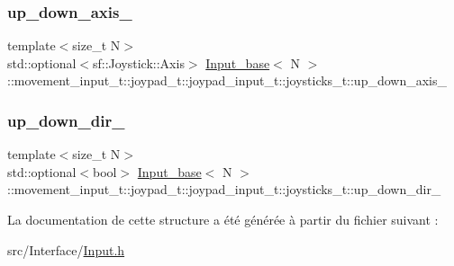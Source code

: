 \subsubsection{\texorpdfstring{up\+\_\+down\+\_\+axis\+\_\+}{up\_down\_axis\_}}
{\footnotesize\ttfamily template$<$size\+\_\+t N$>$ \\
std\+::optional$<$sf\+::\+Joystick\+::\+Axis$>$ \hyperlink{class_input__base}{Input\+\_\+base}$<$ N $>$\+::movement\+\_\+input\+\_\+t\+::joypad\+\_\+t\+::joypad\+\_\+input\+\_\+t\+::joysticks\+\_\+t\+::up\+\_\+down\+\_\+axis\+\_\+}

\mbox{\label{struct_input__base_1_1movement__input__t_1_1joypad__t_1_1joypad__input__t_1_1joysticks__t_a70ec58fb91a56fc7679773b4b4b595f7}} 
\subsubsection{\texorpdfstring{up\+\_\+down\+\_\+dir\+\_\+}{up\_down\_dir\_}}
{\footnotesize\ttfamily template$<$size\+\_\+t N$>$ \\
std\+::optional$<$bool$>$ \hyperlink{class_input__base}{Input\+\_\+base}$<$ N $>$\+::movement\+\_\+input\+\_\+t\+::joypad\+\_\+t\+::joypad\+\_\+input\+\_\+t\+::joysticks\+\_\+t\+::up\+\_\+down\+\_\+dir\+\_\+}



La documentation de cette structure a été générée à partir du fichier suivant \+:\begin{DoxyCompactItemize}
\item 
src/\+Interface/\hyperlink{_input_8h}{Input.\+h}\end{DoxyCompactItemize}
